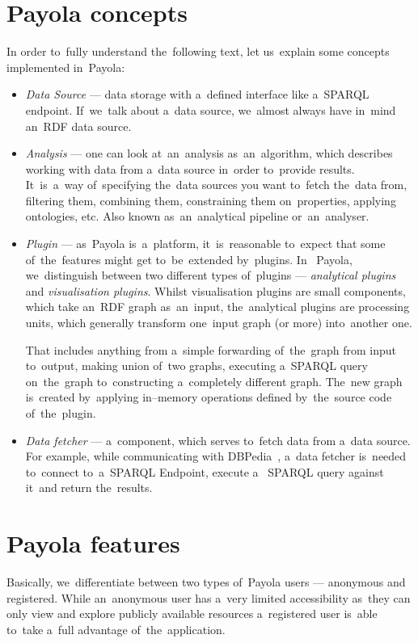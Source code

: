 \section{Payola concepts}
In order to~fully understand the~following text, let us~explain some concepts 
implemented in~Payola:
\begin{itemize}
  \item \emph{Data Source} --- data storage with a~defined interface like a~SPARQL endpoint.
  If~we~talk about a~data source, we~almost always have in~mind an~RDF data source.
  
  \item \emph{Analysis} --- one can look at~an~analysis as~an~algorithm, which 
  describes working with data from a~data source in~order to~provide results. 
  It~is~a~way of~specifying the~data sources you want to~fetch the~data from, 
  filtering them, combining them, constraining them on~properties, applying 
  ontologies, etc. Also known as~an~analytical pipeline or~an~analyser.  
  
  \item \emph{Plugin} --- as~Payola is~a~platform, it~is~reasonable to~expect that 
  some of~the~features might get to~be~extended by~plugins. In~  Payola, we~distinguish between two different types of~plugins --- \emph{analytical plugins} and 
  \emph{visualisation plugins}. Whilst visualisation plugins are small components, 
  which take an~RDF graph as~an~input, the~analytical plugins are processing 
  units, which generally transform one~input graph (or more) into~another one.
  
  That includes anything from a~simple forwarding of~the~graph from input to~output, 
  making union of~two graphs, executing a~SPARQL query on~the~graph to~constructing 
  a~completely different graph. The~new graph is~created by~applying in--memory
  operations defined by~the~source code of~the~plugin.
  
  \item \emph{Data fetcher} --- a~component, which serves to~fetch data from a~data 
  source. For example, while communicating with DBPedia~\cite{dbpedia},
  a~data fetcher is~needed to~connect to~a~SPARQL Endpoint, execute a~  SPARQL query against it~and return the~results.
\end{itemize}

\section{Payola features}
Basically, we~differentiate between two types of~Payola users --- anonymous and registered. 
While an~anonymous user has a~very limited accessibility as~they can only 
view and explore publicly available resources a~registered user is~able to~take a~full advantage of~the~application.

